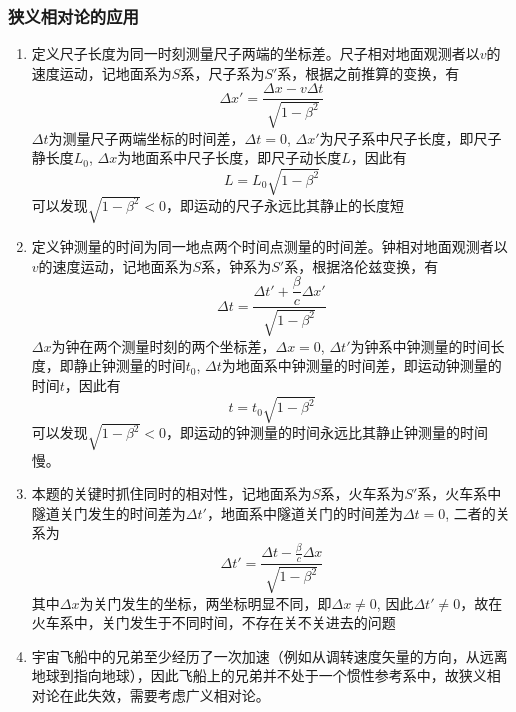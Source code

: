 \documentclass[UTF8]{ctexart}
\numberwithin{equation}{section}
\begin{document}
\subsubsection{狭义相对论的应用}
\begin{enumerate}
    \item 定义尺子长度为同一时刻测量尺子两端的坐标差。尺子相对地面观测者以$v$的速度运动，记地面系为$S$系，尺子系为$S'$系，根据之前推算的变换，有
    \[
    \Delta x' = \frac{\Delta x - v\Delta t}{\sqrt{1-\beta^2}}
    \]
    $\Delta t$为测量尺子两端坐标的时间差，$\Delta t = 0$, $\Delta x'$为尺子系中尺子长度，即尺子静长度$L_0$, $\Delta x$为地面系中尺子长度，即尺子动长度$L$，因此有
    \[
    L = L_0\sqrt{1-\beta^2}
    \]
    可以发现$\sqrt{1-\beta^2} < 0$，即运动的尺子永远比其静止的长度短

    \item 定义钟测量的时间为同一地点两个时间点测量的时间差。钟相对地面观测者以$v$的速度运动，记地面系为$S$系，钟系为$S'$系，根据洛伦兹变换，有
    \[
    \Delta t = \frac{\Delta t' + \dfrac{\beta}{c}\Delta x'}{\sqrt{1-\beta^2}}
    \]
    $\Delta x$为钟在两个测量时刻的两个坐标差，$\Delta x = 0$, $\Delta t'$为钟系中钟测量的时间长度，即静止钟测量的时间$t_0$, $\Delta t$为地面系中钟测量的时间差，即运动钟测量的时间$t$，因此有
    \[
    t = t_0 \sqrt{1-\beta^2}
    \]
    可以发现$\sqrt{1-\beta^2} < 0$，即运动的钟测量的时间永远比其静止钟测量的时间慢。

    \item 本题的关键时抓住同时的相对性，记地面系为$S$系，火车系为$S'$系，火车系中隧道关门发生的时间差为$\Delta t'$，地面系中隧道关门的时间差为$\Delta t = 0$, 二者的关系为
    \[
    \Delta t' = \frac{\Delta t - \frac{\beta}{c} \Delta x}{\sqrt{1-\beta^2}}
    \]
    其中$\Delta x$为关门发生的坐标，两坐标明显不同，即$\Delta x \neq 0$, 因此$\Delta t' \neq 0$，故在火车系中，关门发生于不同时间，不存在关不关进去的问题

    \item 宇宙飞船中的兄弟至少经历了一次加速（例如从调转速度矢量的方向，从远离地球到指向地球），因此飞船上的兄弟并不处于一个惯性参考系中，故狭义相对论在此失效，需要考虑广义相对论。
\end{enumerate}
\end{document}
